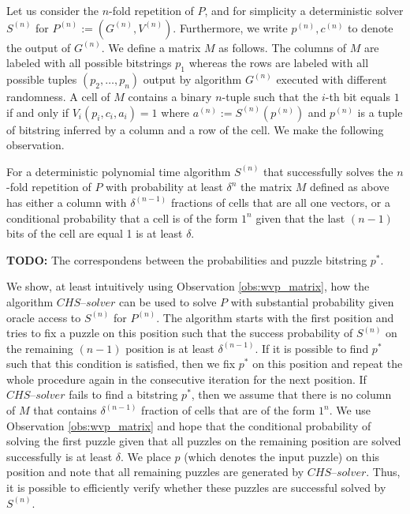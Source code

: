 Let us consider the $n$-fold repetition of $P$, and for simplicity a deterministic solver $S^{(n)}$ for $P^{(n)} := (G^{(n)}, V^{(n)})$.
Furthermore, we write $p^{(n)}, c^{(n)}$ to denote the output of $G^{(n)}$.
We define a matrix $M$ as follows. The columns of $M$ are labeled with all possible bitstrings $p_1$
whereas the rows are labeled with all possible tuples $(p_2, \dotsc, p_n)$ output by algorithm $G^{(n)}$
executed with different randomness.
A cell of $M$ contains a binary $n$-tuple such that the $i$-th bit equals $1$ if and only if $V_i(p_i, c_i, a_i) = 1$ where
 $a^{(n)} := S^{(n)}(p^{(n)})$ and $p^{(n)}$ is a tuple of bitstring inferred by a column and a row of the cell.
We make the following observation.
%
\begin{observation}
\label{obs:wvp_matrix}
For a deterministic polynomial time algorithm $S^{(n)}$ that successfully solves the $n$-fold repetition of $P$ with probability at least $\delta^{n}$
the matrix $M$ defined as above has either a column with $\delta^{(n-1)}$ fractions of cells that are all one vectors, or
a conditional probability that a cell is of the form $1^n$ given that the last $(n-1)$ bits of the cell are equal 1 is at least $\delta$.
\end{observation}
%
%
\begin{todo}
  \textbf{TODO:} The correspondens between the probabilities and puzzle bitstring $p^*$.
\end{todo}
%
We show, at least intuitively using Observation \ref{obs:wvp_matrix}, how the algorithm $\mathit{CHS\text{--}solver}$ can be used to solve $P$
with substantial probability given oracle access to $S^{(n)}$ for $P^{(n)}$.
The algorithm starts with the first position and tries to fix a puzzle on this position such that the success probability of $S^{(n)}$ on the remaining $(n-1)$
position is at least $\delta^{(n-1)}$. If it is possible to find $p^*$ such that this condition is satisfied, then we fix $p^*$
on this position and repeat the whole procedure again in the consecutive iteration for the next position.
If $\mathit{CHS\text{--}solver}$ fails to find a bitstring $p^*$, then we assume that there is no column of $M$ that contains $\delta^{(n-1)}$ fraction
of cells that are of the form $1^n$. We use Observation \ref{obs:wvp_matrix} and hope that the conditional probability of
solving the first puzzle given that all puzzles on the remaining position are solved successfully is at least $\delta$.
We place $p$ (which denotes the input puzzle) on this position and note that all remaining puzzles are generated by $\mathit{CHS\text{--}solver}$.
Thus, it is possible to efficiently verify whether these puzzles are successful solved by $S^{(n)}$.

